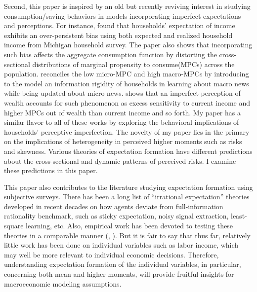 \documentclass[12pt,notitlepage,onecolumn,aps,pra]{article}
\begin{document}
Second, this paper is inspired by an old but recently reviving interest
in studying consumption/saving behaviors in models incorporating
imperfect expectations and perceptions. For instance,
\cite{rozsypal_overpersistence_2017} found that households' expectation
of income exhibits an over-persistent bias using both expected and
realized household income from Michigan household survey. The paper also
shows that incorporating such bias affects the aggregate consumption
function by distorting the cross-sectional distributions of marginal
propensity to consume(MPCs) across the population.
\cite{carroll_sticky_2018} reconciles the low micro-MPC and high
macro-MPCs by introducing to the model an information rigidity of
households in learning about macro news while being updated about micro
news. \cite{lian2019imperfect} shows that an imperfect perception of
wealth accounts for such phenomenon as excess sensitivity to current
income and higher MPCs out of wealth than current income and so forth.
My paper has a similar flavor to all of these works by exploring the
behavioral implications of households' perceptive imperfection. The
novelty of my paper lies in the primary on the implications of
heterogeneity in perceived higher moments such as risks and skewness.
Various theories of expectation formation have different predictions
about the cross-sectional and dynamic patterns of perceived risks. I
examine these predictions in this paper.

This paper also contributes to the literature studying expectation
formation using subjective surveys. There has been a long list of
``irrational expectation'' theories developed in recent decades on how
agents deviate from full-information rationality benchmark, such as
sticky expectation, noisy signal extraction, least-square learning, etc.
Also, empirical work has been devoted to testing these theories in a
comparable manner (\cite{coibion2012can}, \cite{fuhrer2018intrinsic}).
But it is fair to say that thus far, relatively little work has been
done on individual variables such as labor income, which may well be
more relevant to individual economic decisions. Therefore, understanding
expectation formation of the individual variables, in particular,
concerning both mean and higher moments, will provide fruitful insights
for macroeconomic modeling assumptions.
\end{document}
